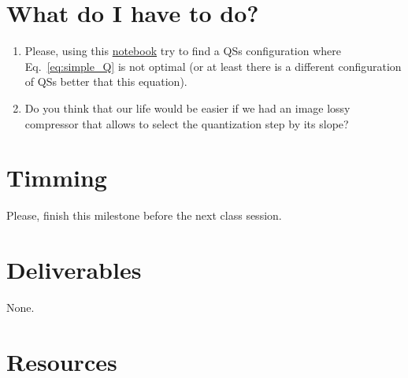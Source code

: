 \section{What do I have to do?}
\begin{enumerate}
\item Please, using this
  \href{https://github.com/Sistemas-Multimedia/Sistemas-Multimedia.github.io/blob/master/milestones/05-RGB_quantization/RGB_quantization.ipynb}{notebook}
  try to find a QSs configuration where Eq.~\ref{eq:simple_Q} is not
  optimal (or at least there is a different configuration of QSs
  better that this equation).
\item Do you think that our life would be easier if we had an image
  lossy compressor that allows to select the quantization step by its
  slope?
\end{enumerate}

\section{Timming}

Please, finish this milestone before the next class session.

\section{Deliverables}

None.

\section{Resources}

\renewcommand{\addcontentsline}[3]{}%

